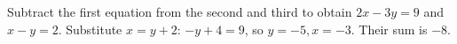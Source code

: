 Subtract the first equation from the second and third to obtain $2x-3y=9$ and $x-y=2$. Substitute $x=y+2$: $-y+4=9$, so $y=-5,x=-3$. Their sum is $\boxed{-8}$.
